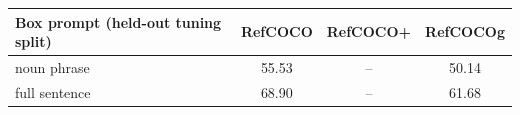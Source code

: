 \begin{tabular}{lccc}
\toprule
Box prompt (held-out tuning split) & RefCOCO & RefCOCO+ & RefCOCOg \\
\midrule
noun phrase & 55.53 & -- & 50.14 \\  %
full sentence & 68.90 & -- & 61.68 \\  %
\bottomrule
\end{tabular}

